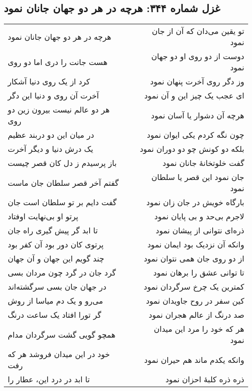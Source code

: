 \begin{center}
\section*{غزل شماره ۳۴۴: هرچه در هر دو جهان جانان نمود}
\label{sec:344}
\begin{longtable}{l p{0.5cm} r}
هرچه در هر دو جهان جانان نمود
&&
تو یقین می‌دان که آن از جان نمود
\\
هست جانت را دری اما دو روی
&&
دوست از دو روی او دو جهان نمود
\\
کرد از یک روی دنیا آشکار
&&
وز دگر روی آخرت پنهان نمود
\\
آخرت آن روی و دنیا این دگر
&&
ای عجب یک چیز این و آن نمود
\\
هر دو عالم نیست بیرون زین دو روی
&&
هرچه آن دشوار یا آسان نمود
\\
در میان این دو دربند عظیم
&&
چون نگه کردم یکی ایوان نمود
\\
یک درش دنیا و دیگر آخرت
&&
بلکه دو کونش چو دو دوران نمود
\\
باز پرسیدم ز دل کان قصر چیست
&&
گفت خلوتخانهٔ جانان نمود
\\
گفتم آخر قصر سلطان جان ماست
&&
جان نمود این قصر یا سلطان نمود
\\
گفت دایم بر تو سلطان است جان
&&
بارگاه خویش در جان زان نمود
\\
پرتو او بی‌نهایت اوفتاد
&&
لاجرم بی‌حد و بی پایان نمود
\\
تا ابد گر پیش گیری راه جان
&&
ذره‌ای نتوانی از پیشان نمود
\\
پرتوی کان دور بود آن کفر بود
&&
وانکه آن نزدیک بود ایمان نمود
\\
چند گویم این جهان و آن جهان
&&
از دو روی جان همی نتوان نمود
\\
گرد جان در گرد چون مردان بسی
&&
تا توانی عشق را برهان نمود
\\
در جهان جان بسی سرگشته‌اند
&&
کمترین یک چرخ سرگردان نمود
\\
می‌رو و یک دم میاسا از روش
&&
کین سفر در روح جاویدان نمود
\\
گر تورا افتاد یک ساعت درنگ
&&
صد درنگ از عالم هجران نمود
\\
همچو گویی گشت سرگردان مدام
&&
هر که خود را مرد این میدان نمود
\\
خود در این میدان فروشد هر که رفت
&&
وانکه یکدم ماند هم حیران نمود
\\
تا ابد در درد این، عطار را
&&
ذره ذره کلبهٔ احزان نمود
\\
\end{longtable}
\end{center}
